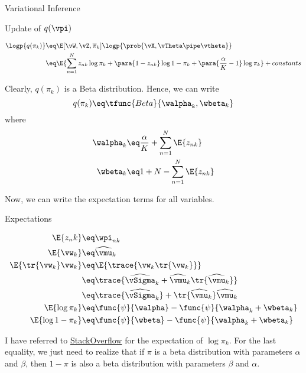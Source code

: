 \documentclass{article}
\begin{document}
\begin{question}
\begin{qsection}{Variational Inference}
		\begin{qsubsection}{\boldmath Update of $q(\vpi)$}

			\begin{align*}
				\logp{q(\pi_k)}	&\eq	\E[\vW, \vZ, \overline{\pi}_k]{\logp{\prob{\vX, \vTheta \pipe \vtheta}}} \\
				&\eq	\E{\sum_{n = 1}^N z_{nk} \log{\pi_k} + \para{1 - z_{nk}} \log{1 - \pi_k} + \para{\frac{\alpha}{K} - 1} \log{\pi_k}} + constants
			\end{align*}

			Clearly, $q(\pi_k)$ is a Beta distribution. Hence, we can write
			\begin{equation}
				q(\pi_k)	\eq	\tfunc{Beta}{\walpha_k, \wbeta_k}
			\end{equation}
			where
			\begin{align*}
				\walpha_k	&\eq	\frac{\alpha}{K} + \sum_{n = 1}^N \E{z_{nk}} \\
				\wbeta_k	&\eq	1 + N - \sum_{n = 1}^N \E{z_{nk}} \\
			\end{align*}

		\end{qsubsection}

		Now, we can write the expectation terms for all variables.

		\begin{qsubsection}{Expectations}

			\begin{align*}
				\E{z_nk}				&\eq	\wpi_{nk} \\
				\E{\vw_k}				&\eq	\widehat{\vmu}_k \\
				\E{\tr{\vw_k} \vw_k}	&\eq	\E{\trace{\vw_k \tr{\vw_k}}} \\
				&\eq	\trace{\widehat{\vSigma}_k + \widehat{\vmu}_k \tr{\widehat{\vmu}_k}} \\
				&\eq	\trace{\widehat{\vSigma}_k} + \tr{\widehat{\vmu}_k} \widehat{\vmu}_k \\
				\E{\log{\pi_k}}			&\eq	\func{\psi}{\walpha} - \func{\psi}{\walpha_k + \wbeta_k} \\
				\E{\log{1 - \pi_k}}		&\eq	\func{\psi}{\wbeta} - \func{\psi}{\walpha_k + \wbeta_k}
			\end{align*}

			I have referred to \href{https://stats.stackexchange.com/questions/241993/pdf-of-y-logx-when-x-is-beta-distributed-the-expected-value-of-y/242020}{StackOverflow} for the expectation of $\log{\pi_k}$. For the last equality, we just need to realize that if $\pi$ is a beta distribution with parameters $\alpha$ and $\beta$, then $1 - \pi$ is also a beta distribution with parameters $\beta$ and $\alpha$.


\end{qsubsection}
\end{qsection}
\end{question}
\end{document}

